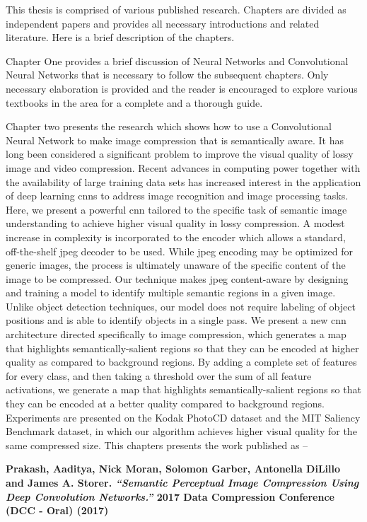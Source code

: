 This thesis is comprised of various published research. Chapters are divided as independent papers and provides all necessary introductions and related literature. Here is a brief description of the chapters.

Chapter One provides a brief discussion of Neural Networks and Convolutional Neural Networks that is necessary to follow the subsequent chapters. Only necessary elaboration is provided and the reader is encouraged to explore various textbooks in the area for a complete and a thorough guide.

Chapter two presents the research which shows how to use a Convolutional Neural Network to make image compression that is semantically aware.
It has long been considered a significant problem to improve the visual quality of lossy image and video compression. Recent advances in computing power together with the availability of large training data sets has increased interest in the application of deep learning cnns to address image recognition and image processing tasks. Here, we present a powerful cnn tailored to the specific task of semantic image understanding to achieve higher visual quality in lossy compression. A modest increase in complexity is incorporated to the encoder which allows a standard, off-the-shelf jpeg decoder to be used. While jpeg encoding may be optimized for generic images, the process is ultimately unaware of the specific content of the image to be compressed. Our technique makes jpeg content-aware by designing and training a model to identify multiple semantic regions in a given image. Unlike object detection techniques, our model does not require labeling of object positions and is able to identify objects in a single pass. We present a new cnn architecture directed specifically to image compression, which generates a map that highlights semantically-salient regions so that they can be encoded at higher quality as compared to background regions. By adding a complete set of features for every class, and then taking a threshold over the sum of all feature activations, we generate a map that highlights semantically-salient regions so that they can be encoded at a better quality compared to background regions. Experiments are presented on the Kodak PhotoCD dataset and the MIT Saliency Benchmark dataset, in which our algorithm achieves higher visual quality for the same compressed size.
This chapters presents the work published as --

\noindent\textbf{
Prakash, Aaditya, Nick Moran, Solomon Garber, Antonella DiLillo and James A. Storer. \textit{``Semantic Perceptual Image Compression Using Deep Convolution Networks.''} 2017 Data Compression Conference (DCC - Oral) (2017)
}
\vspace{2em}

